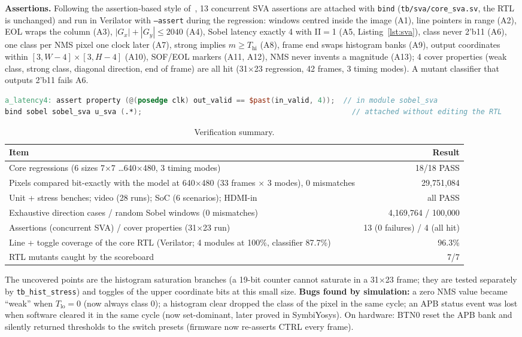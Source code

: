 \documentclass[11pt,a4paper]{article}
\begin{document}
\textbf{Assertions.} Following the assertion-based style of~\cite{bening}, 13 concurrent SVA assertions are attached with \texttt{bind} (\texttt{tb/sva/core\_sva.sv}, the RTL is
unchanged) and run in Verilator with \texttt{--assert} during the regression: windows centred inside the image (A1), line pointers
in range (A2), EOL wraps the column (A3), $|G_x|+|G_y|\le2040$ (A4), Sobel latency exactly 4 with II$=$1 (A5,
Listing~\ref{lst:sva}), class never 2'b11 (A6), one class per NMS pixel one clock later (A7), strong implies $m\ge T_\text{hi}$
(A8), frame end swaps histogram banks (A9), output coordinates within $[3,W{-}4]\times[3,H{-}4]$ (A10), SOF/EOL markers (A11, A12),
NMS never invents a magnitude (A13); 4 cover properties (weak class, strong class, diagonal direction, end of frame) are all hit
(31$\times$23 regression, 42 frames, 3 timing modes). A mutant
classifier that outputs 2'b11 fails A6.
\begin{lstlisting}[language=Verilog,caption={Assertion A5: initiation interval 1 and fixed latency of the hand-HLS Sobel.},label={lst:sva}]
a_latency4: assert property (@(posedge clk) out_valid == $past(in_valid, 4));  // in module sobel_sva
bind sobel sobel_sva u_sva (.*);                                                 // attached without editing the RTL
\end{lstlisting}
\begin{table}[H]\centering\footnotesize
\caption{Verification summary.}\label{tab:simsummary}
\begin{tabularx}{\linewidth}{@{}Xr@{}}
\toprule
Item & Result\\
\midrule
Core regressions (6 sizes 7$\times$7 \ldots 640$\times$480, 3 timing modes) & 18/18 PASS\\
Pixels compared bit-exactly with the model at 640$\times$480 (33 frames $\times$ 3 modes), 0 mismatches & 29{,}751{,}084\\
Unit + stress benches; video (28 runs); SoC (6 scenarios); HDMI-in & all PASS\\
Exhaustive direction cases / random Sobel windows (0 mismatches) & 4{,}169{,}764 / 100{,}000\\
Assertions (concurrent SVA) / cover properties (31$\times$23 run) & 13 (0 failures) / 4 (all hit)\\
Line + toggle coverage of the core RTL (Verilator; 4 modules at 100\%, classifier 87.7\%) & 96.3\%\\
RTL mutants caught by the scoreboard & 7/7\\
\bottomrule
\end{tabularx}
\end{table}
The uncovered points are the histogram saturation branches (a 19-bit counter cannot saturate in a 31$\times$23 frame; they are
tested separately by \texttt{tb\_hist\_stress}) and toggles of the upper coordinate bits at this small size.
\textbf{Bugs found by simulation:} a zero NMS value became ``weak'' when $T_\text{lo}=0$ (now always class 0); a histogram clear
dropped the class of the pixel in the same cycle; an APB status event was lost when software cleared it in the same cycle
(now set-dominant, later proved in SymbiYosys). On hardware: BTN0 reset the
APB bank and silently returned thresholds to the switch presets (firmware now re-asserts CTRL every frame).
\end{document}
